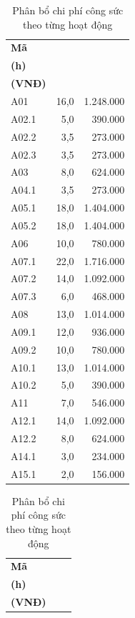 \begin{table}[H]
\centering
\caption{Phân bổ chi phí công sức theo từng hoạt động}\label{tab:activitycost}
\begingroup\small
\setlength{\tabcolsep}{2pt}\renewcommand{\arraystretch}{1.18}
\begin{minipage}[t]{.46\linewidth}
\vspace{0pt}\centering
\begin{tabular*}{\linewidth}{@{\extracolsep{\fill}}lrr@{}}
\toprule
\textbf{Mã} & \shortstack{\textbf{Công sức}\\\textbf{(h)}} & \shortstack{\textbf{Chi phí}\\\textbf{(VNĐ)}} \\
\midrule
A01 & 16,0 & 1.248.000 \\
A02.1 & 5,0 & 390.000 \\
A02.2 & 3,5 & 273.000 \\
A02.3 & 3,5 & 273.000 \\
A03 & 8,0 & 624.000 \\
A04.1 & 3,5 & 273.000 \\
A05.1 & 18,0 & 1.404.000 \\
A05.2 & 18,0 & 1.404.000 \\
A06 & 10,0 & 780.000 \\
A07.1 & 22,0 & 1.716.000 \\
A07.2 & 14,0 & 1.092.000 \\
A07.3 & 6,0 & 468.000 \\
A08 & 13,0 & 1.014.000 \\
A09.1 & 12,0 & 936.000 \\
A09.2 & 10,0 & 780.000 \\
A10.1 & 13,0 & 1.014.000 \\
A10.2 & 5,0 & 390.000 \\
A11 & 7,0 & 546.000 \\
A12.1 & 14,0 & 1.092.000 \\
A12.2 & 8,0 & 624.000 \\
A14.1 & 3,0 & 234.000 \\
A15.1 & 2,0 & 156.000 \\
\bottomrule
\end{tabular*}
\end{minipage}\hfill
\begin{minipage}[t]{.46\linewidth}
\vspace{0pt}\centering
\begin{tabular*}{\linewidth}{@{\extracolsep{\fill}}lrr@{}}
\toprule
\textbf{Mã} & \shortstack{\textbf{Công sức}\\\textbf{(h)}} & \shortstack{\textbf{Chi phí}\\\textbf{(VNĐ)}} \\

\end{tabular*}
\end{minipage}
\end{table}
